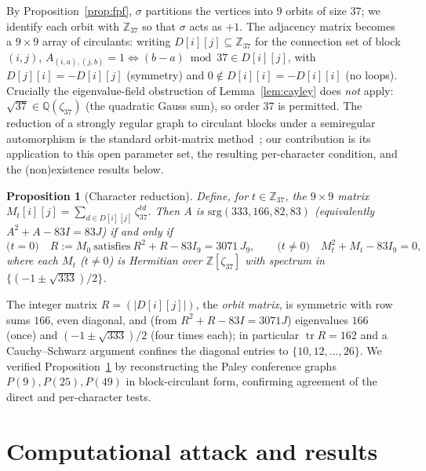\documentclass[11pt]{article}
\newtheorem{proposition}{Proposition}
\theoremstyle{definition}
\newcommand{\Z}{\mathbb{Z}}
\newcommand{\Q}{\mathbb{Q}}
\begin{document}
By Proposition~\ref{prop:fpf}, $\sigma$ partitions the vertices into $9$ orbits of size
$37$; we identify each orbit with $\Z_{37}$ so that $\sigma$ acts as $+1$. The adjacency matrix becomes a
$9\times9$ array of circulants: writing $D[i][j]\subseteq\Z_{37}$ for the connection set of block $(i,j)$,
$A_{(i,a),(j,b)}=1 \iff (b-a)\bmod 37\in D[i][j]$, with $D[j][i]=-D[i][j]$ (symmetry) and
$0\notin D[i][i]=-D[i][i]$ (no loops). Crucially the eigenvalue-field obstruction of Lemma~\ref{lem:cayley}
does \emph{not} apply: $\sqrt{37}\in\Q(\zeta_{37})$ (the quadratic Gauss sum), so order $37$ is permitted.
The reduction of a strongly regular graph to circulant blocks under a semiregular automorphism is the
standard orbit-matrix method~\cite{behbahani,crnkovic}; our contribution is its application to this open
parameter set, the resulting per-character condition, and the (non)existence results below.

\begin{proposition}[Character reduction]\label{prop:char}
Define, for $t\in\Z_{37}$, the $9\times9$ matrix
$M_t[i][j]=\sum_{d\in D[i][j]}\zeta_{37}^{td}$. Then $A$ is $\mathrm{srg}(333,166,82,83)$ (equivalently
$A^2+A-83I=83J$) if and only if
\[
\text{($t=0$)}\quad R:=M_0\ \text{satisfies}\ R^2+R-83I_9=3071\,J_9,\qquad
\text{($t\neq0$)}\quad M_t^2+M_t-83I_9=0,
\]
where each $M_t$ ($t\neq0$) is Hermitian over $\Z[\zeta_{37}]$ with spectrum in
$\{(-1\pm\sqrt{333})/2\}$.
\end{proposition}

The integer matrix $R=(|D[i][j]|)$, the \emph{orbit matrix}, is symmetric with row sums $166$, even
diagonal, and (from $R^2+R-83I=3071J$) eigenvalues $166$ (once) and $(-1\pm\sqrt{333})/2$ (four times
each); in particular $\operatorname{tr}R=162$ and a Cauchy--Schwarz argument confines the diagonal entries
to $\{10,12,\dots,26\}$. We verified Proposition~\ref{prop:char} by reconstructing the Paley conference
graphs $P(9),P(25),P(49)$ in block-circulant form, confirming agreement of the direct and per-character
tests.

\section{Computational attack and results}\label{sec:comp}
\end{document}
